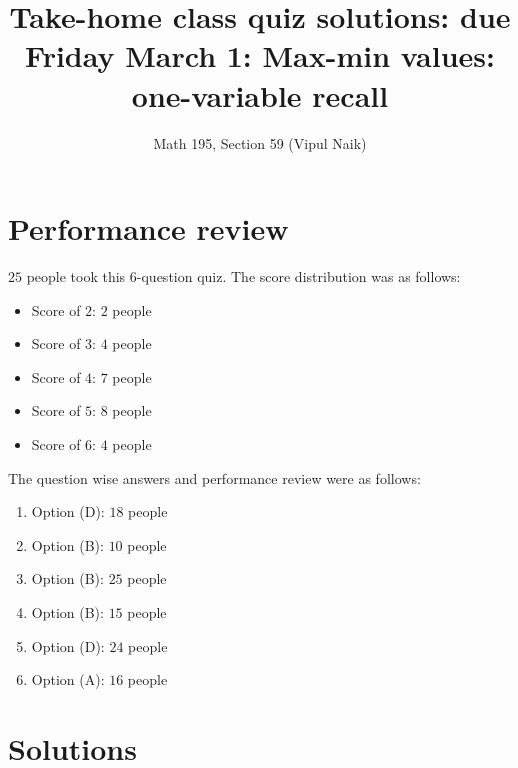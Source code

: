 \documentclass[10pt]{amsart}
\title{Take-home class quiz solutions: due Friday March 1: Max-min values: one-variable recall}
\author{Math 195, Section 59 (Vipul Naik)}
\begin{document}
\maketitle

\section{Performance review}

$25$ people took this $6$-question quiz. The score distribution was as
follows:

\begin{itemize}
\item Score of $2$: $2$ people
\item Score of $3$: $4$ people
\item Score of $4$: $7$ people
\item Score of $5$: $8$ people
\item Score of $6$: $4$ people
\end{itemize}

The question wise answers and performance review were as follows:

\begin{enumerate}
\item Option (D): $18$ people
\item Option (B): $10$ people
\item Option (B): $25$ people
\item Option (B): $15$ people
\item Option (D): $24$ people
\item Option (A): $16$ people
\end{enumerate}

\section{Solutions}
\end{document}
